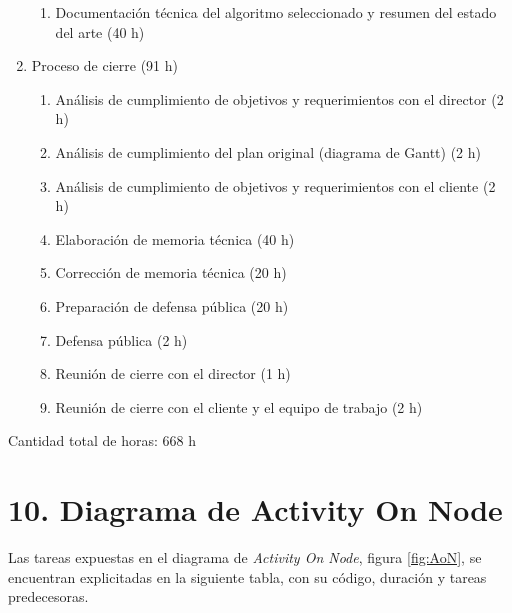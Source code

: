 \documentclass[
11pt, %
codirector, %
]{charter}
\begin{document}
\begin{enumerate}
\begin{enumerate}
		\item Documentación técnica del algoritmo seleccionado y resumen del estado del arte (40 h)
	\end{enumerate}
	\item Proceso de cierre (91 h)
	\begin{enumerate}
		\item Análisis de cumplimiento de objetivos y requerimientos con el director (2 h)
		\item Análisis de cumplimiento del plan original (diagrama de Gantt) (2 h)
		\item Análisis de cumplimiento de objetivos y requerimientos con el cliente (2 h)
		\item Elaboración de memoria técnica (40 h)
		\item Corrección de memoria técnica (20 h)
		\item Preparación de defensa pública (20 h)
		\item Defensa pública (2 h)
		\item Reunión de cierre con el director (1 h)
		\item Reunión de cierre con el cliente y el equipo de trabajo (2 h)
	\end{enumerate}
\end{enumerate}

Cantidad total de horas: 668 h

\section{10. Diagrama de Activity On Node}
\label{sec:AoN}

Las tareas expuestas en el diagrama de \textit{Activity On Node}, figura \ref{fig:AoN}, se encuentran explicitadas en la siguiente tabla, con su código, duración y tareas predecesoras.
\end{document}
